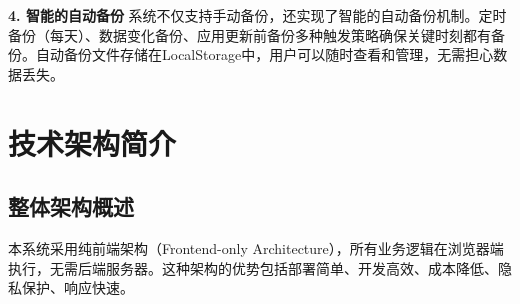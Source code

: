 \documentclass[12pt,a4paper]{article}
\begin{document}
\textbf{4. 智能的自动备份}
系统不仅支持手动备份，还实现了智能的自动备份机制。定时备份（每天）、数据变化备份、应用更新前备份多种触发策略确保关键时刻都有备份。自动备份文件存储在LocalStorage中，用户可以随时查看和管理，无需担心数据丢失。

\section{技术架构简介}

\subsection{整体架构概述}

本系统采用纯前端架构（Frontend-only Architecture），所有业务逻辑在浏览器端执行，无需后端服务器。这种架构的优势包括部署简单、开发高效、成本降低、隐私保护、响应快速。
\end{document}
